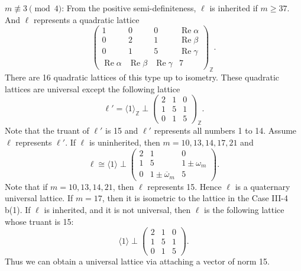 \documentclass[a4paper,10pt,reqno]{amsart}
\begin{document}
{}  $m {\not\equiv} 3 \pmod{4}$: From the positive
semi-definiteness, $\ell$ is inherited if $m \ge 37$. And $\ell$
represents a quadratic lattice
\[
    \begin{pmatrix}
        1 & 0 & 0 & {\operatorname{Re}}{\alpha} \\
        0 & 2 & 1 & {\operatorname{Re}}{\beta} \\
        0 & 1 & 5 & {\operatorname{Re}}{\gamma} \\
        {\operatorname{Re}}{\alpha} & {\operatorname{Re}}{\beta} & {\operatorname{Re}}{\gamma} & 7
    \end{pmatrix}_{\mathbb{Z}}.
\]
There are 16 quadratic lattices of this type up to isometry. These
quadratic lattices are universal except the following lattice
\[
    \ell' = {\langle {1} \rangle}_{\mathbb{Z}} \perp {\begin{pmatrix}
  {2} & {1} & {0} \\
  {1} & {5} & {1} \\
  {0} & {1} & {5}
\end{pmatrix}}_{\mathbb{Z}}.
\]
Note that the truant of $\ell'$ is 15 and $\ell'$ represents all numbers 1 to 14. Assume $\ell$
represents $\ell'$. If $\ell$ is uninherited, then $m = 10, 13, 14, 17, 21$ and
\[
    \ell \cong {\langle {1} \rangle} \perp {\begin{pmatrix}
  2 & 1 & 0 \\
  1 & 5 & {1\pm\omega_m} \\
  0 & {1\pm{{{\overline{\omega}}}}_m} & 5
\end{pmatrix}}.
\]
Note that if $m= 10, 13, 14, 21$, then $\ell$ represents 15. Hence $\ell$ is a quaternary universal
lattice. If $m = 17$, then it is isometric to the lattice in the Case III-4 b(1). If $\ell$ is
inherited, and it is not universal, then $\ell$ is the following lattice whose truant is 15:
\[
    {\langle {1} \rangle} \perp {\begin{pmatrix}
  {2} & {1} & {0} \\
  {1} & {5} & {1} \\
  {0} & {1} & {5}
\end{pmatrix}}.
\]
Thus we can obtain a universal lattice via attaching a vector of norm 15.
\end{document}
